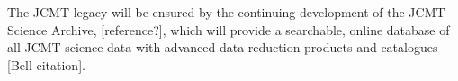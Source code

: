 \documentclass[]{spie}  %
\begin{document}
The JCMT legacy will be ensured by the continuing development of the
JCMT Science Archive, [reference?], which will provide a searchable,
online database of all JCMT science data with advanced data-reduction
products and catalogues [Bell citation].

\acknowledgments     %



\end{document}

